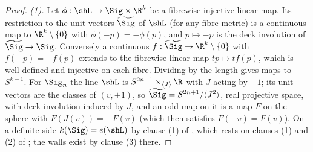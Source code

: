 \begin{proof}
\emph{(1).} Let $\phi : \shL \to \Sig \times \R^{k}$ be a fibrewise injective linear map. Its restriction to the unit vectors $\widetilde\Sig$ of $\shL$ (for any fibre metric) is a continuous map to $\R^{k} \setminus \{0\}$ with $\phi(-p) = -\phi(p)$, and $p \mapsto -p$ is the deck involution of $\widetilde\Sig \to \Sig$. Conversely a continuous $f : \widetilde\Sig \to \R^{k} \setminus \{0\}$ with $f(-p) = -f(p)$ extends to the fibrewise linear map $tp \mapsto tf(p)$, which is well defined and injective on each fibre. Dividing by the length gives maps to $S^{k-1}$. For $\Sig_{n}$ the line $\shL$ is $S^{2n+1} \times_{\langle J \rangle} \R$ with $J$ acting by $-1$; its unit vectors are the classes of $(v, \pm 1)$, so $\widetilde\Sig = S^{2n+1}/\langle J^{2} \rangle$, real projective space, with deck involution induced by $J$, and an odd map on it is a map $F$ on the sphere with $F(J(v)) = -F(v)$ (which then satisfies $F(-v) = F(v)$). On a definite side $k(\Sig) = e(\shL)$ by clause (1) of , which rests on clauses (1) and (2) of ; the walls exist by clause (3) there.


\end{proof}
